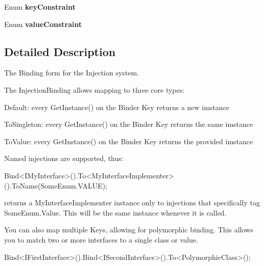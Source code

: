\begin{DoxyCompactItemize}
\item 
\hypertarget{interfacestrange_1_1extensions_1_1injector_1_1api_1_1_i_injection_binding_af62e792e40a882f5d2c52a372e0746b0}{Enum {\bfseries key\-Constraint}}\label{interfacestrange_1_1extensions_1_1injector_1_1api_1_1_i_injection_binding_af62e792e40a882f5d2c52a372e0746b0}

\item 
\hypertarget{interfacestrange_1_1extensions_1_1injector_1_1api_1_1_i_injection_binding_a9ee8175bec67b2f20e2bd6162b45eb8c}{Enum {\bfseries value\-Constraint}}\label{interfacestrange_1_1extensions_1_1injector_1_1api_1_1_i_injection_binding_a9ee8175bec67b2f20e2bd6162b45eb8c}

\end{DoxyCompactItemize}


\subsection{Detailed Description}
The Binding form for the Injection system. 

The Injection\-Binding allows mapping to three core types\-: 
\begin{DoxyItemize}
\item Default\-: every {\ttfamily Get\-Instance()} on the Binder Key returns a new imstance 
\item To\-Singleton\-: every {\ttfamily Get\-Instance()} on the Binder Key returns the same imstance 
\item To\-Value\-: every {\ttfamily Get\-Instance()} on the Binder Key returns the provided imstance 
\end{DoxyItemize}

Named injections are supported, thus\-: \begin{DoxyVerb}Bind<IMyInterface>().To<MyInterfaceImplementer>().ToName(SomeEnum.VALUE);
\end{DoxyVerb}


returns a My\-Interface\-Implementer instance only to injections that specifically tag Some\-Enum.\-Value. This will be the same instance whenever it is called.

You can also map multiple Keys, allowing for polymorphic binding. This allows you to match two or more interfaces to a single class or value. \begin{DoxyVerb}Bind<IFirstInterface>().Bind<ISecondInterface>().To<PolymorphicClass>();
\end{DoxyVerb}


